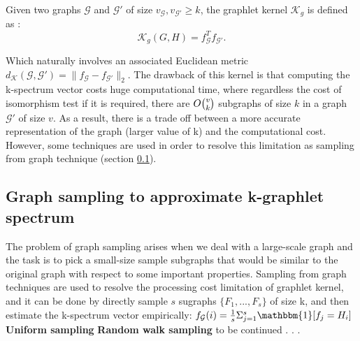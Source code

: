 \begin{definition}
Given two graphs $\mathcal{G}$ and $\mathcal{G}'$ of size $v_\mathcal{G},v_{\mathcal{G}'} \geq k$, the graphlet kernel $\mathcal{K}_g$ is defined as \citep{graphlet_kernel}:
\begin{equation}
\label{eq:graphlet_kernel}
    \mathcal{K}_g(G,H)=f_{\mathcal{G}}^Tf_{\mathcal{G}'}.
\end{equation}
\end{definition}
Which naturally involves an associated Euclidean metric $d_\mathcal{K}({\mathcal{G}},{\mathcal{G}'}) = \|f_{\mathcal{G}} - f_{{\mathcal{G}'}}\|_2$.
The drawback of this kernel is that computing the k-spectrum vector costs huge computational time, where regardless the cost of isomorphism test if it is required,  there are $O\tbinom{v}{k}$  subgraphs of size $k$ in a graph ${\mathcal{G}'}$ of size $v$. As a result, there is a trade off between a more accurate representation of the graph (larger value of k) and the computational cost. However, some techniques are used in order to resolve this limitation as sampling from graph technique (section \ref{graph_sampling}).

\subsection{Graph sampling to approximate k-graphlet spectrum}
\label{graph_sampling}
The problem of graph sampling arises when we deal with a large-scale graph and the task is to pick a small-size sample subgraphs that would be similar to the original graph with respect to some important properties.\newline
Sampling from graph techniques are used to resolve the processing cost limitation of graphlet kernel, and it can be done by directly sample $s$ sugraphs $\{F_1,...,F_s\}$ of size k, and then estimate the k-spectrum vector empirically:
    $f_\mathcal{G}(i)=\frac{1}{s}\Sigma_{j=1}^s \mathbbm{1}[f_j=H_i]$\newline
\textbf{Uniform sampling}
\textbf{Random walk sampling}\newline
to be continued
. 
. 
. 




